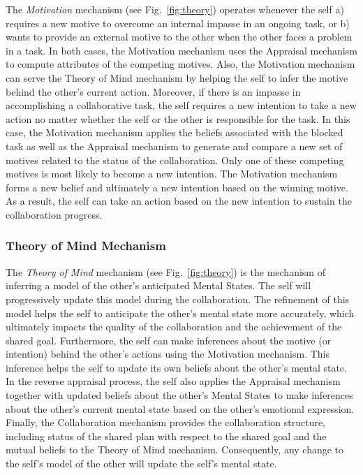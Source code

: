 The \textit{Motivation} mechanism (see Fig.~\ref{fig:theory}) operates whenever
the self a) requires a new motive to overcome an internal impasse in an ongoing
task, or b) wants to provide an external motive to the other when the other
faces a problem in a task. In both cases, the Motivation mechanism uses the
Appraisal mechanism to compute attributes of the competing motives. Also, the
Motivation mechanism can serve the Theory of Mind mechanism by helping the self
to infer the motive behind the other's current action. Moreover, if there is an
impasse in accomplishing a collaborative task, the self requires a new intention
to take a new action no matter whether the self or the other is responsible for
the task. In this case, the Motivation mechanism applies the beliefs associated
with the blocked task as well as the Appraisal mechanism to generate and compare
a new set of motives related to the status of the collaboration. Only one of
these competing motives is most likely to become a new intention. The Motivation
mechanism forms a new belief and ultimately a new intention based on the winning
motive. As a result, the self can take an action based on the new intention to
sustain the collaboration progress.

\subsubsection{Theory of Mind Mechanism}

The \textit{Theory of Mind} mechanism (see Fig.~\ref{fig:theory}) is the
mechanism of inferring a model of the other's anticipated Mental States. The
self will progressively update this model during the collaboration. The
refinement of this model helps the self to anticipate the other's mental state
more accurately, which ultimately impacts the quality of the collaboration and
the achievement of the shared goal. Furthermore, the self can make inferences
about the motive (or intention) behind the other's actions using the Motivation
mechanism. This inference helps the self to update its own beliefs about the
other's mental state. In the reverse appraisal process, the self also applies
the Appraisal mechanism together with updated beliefs about the other's Mental
States to make inferences about the other's current mental state based on the
other's emotional expression. Finally, the Collaboration mechanism provides the
collaboration structure, including status of the shared plan with respect to the
shared goal and the mutual beliefs to the Theory of Mind mechanism.
Consequently, any change to the self's model of the other will update the self's
mental state.

